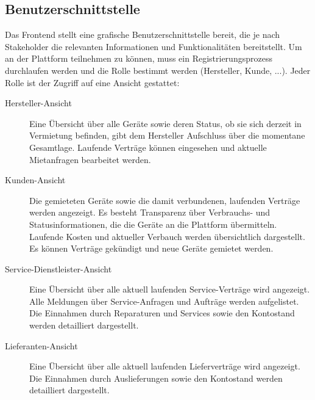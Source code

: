 \subsection{Benutzerschnittstelle}
\label{subsec:iot_usecase:solution:frontend}
Das Frontend stellt eine grafische Benutzerschnittstelle bereit, die je nach Stakeholder die relevanten Informationen und Funktionalitäten bereitstellt. Um an der Plattform teilnehmen zu können, muss ein Registrierungsprozess durchlaufen werden und die Rolle bestimmt werden (Hersteller, Kunde, ...). Jeder Rolle ist der Zugriff auf eine Ansicht gestattet:
\begin{description}
  \item[Hersteller-Ansicht] Eine Übersicht über alle Geräte sowie deren Status, ob sie sich derzeit in Vermietung befinden, gibt dem Hersteller Aufschluss über die momentane Gesamtlage. Laufende Verträge können eingesehen und aktuelle Mietanfragen bearbeitet werden.
  \item[Kunden-Ansicht] Die gemieteten Geräte sowie die damit verbundenen, laufenden Verträge werden angezeigt. Es besteht Transparenz über Verbrauchs- und Statusinformationen, die die Geräte an die Plattform übermitteln. Laufende Kosten und aktueller Verbauch werden übersichtlich dargestellt. Es können Verträge gekündigt und neue Geräte gemietet werden.
  \item[Service-Dienstleister-Ansicht] Eine Übersicht über alle aktuell laufenden Service-Verträge wird angezeigt. Alle Meldungen über Service-Anfragen und Aufträge werden aufgelistet. Die Einnahmen durch Reparaturen und Services sowie den Kontostand werden detailliert dargestellt.
  \item[Lieferanten-Ansicht] Eine Übersicht über alle aktuell laufenden Lieferverträge wird angezeigt. Die Einnahmen durch Auslieferungen sowie den Kontostand werden detailliert dargestellt.
\end{description}


